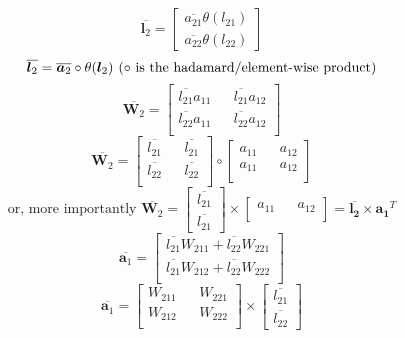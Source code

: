 \documentclass{article}
\begin{document}
\[\overline{\bm{l}_2} = \begin{bmatrix}
   \overline{a_{21}} \theta(l_{21}) \\ \overline{a_{22}} \theta(l_{22})
\end{bmatrix}\]
\begin{equation}
  \overline{\bm{l}_2} = \overline{\bm{a}_2} \circ \theta(\bm{l}_2) \hspace*{0.125cm}(\circ \text{ is the hadamard/element-wise product})
\end{equation}
\[
    \overline{\bm{W}_{2}} = \begin{bmatrix}
        \overline{l_{21}}a_{11} && \overline{l_{21}}a_{12}\\
        \overline{l_{22}}a_{11} && \overline{l_{22}}a_{12}\\
    \end{bmatrix}
\]
\[
    \overline{\bm{W}_{2}} = \begin{bmatrix}
        \overline{l_{21}} && \overline{l_{21}}\\
        \overline{l_{22}} && \overline{l_{22}}\\
    \end{bmatrix} \circ 
    \begin{bmatrix}
        a_{11} && a_{12}\\
        a_{11} && a_{12}\\
    \end{bmatrix}
\]
\begin{equation}
    \text{or, more importantly   }
    \overline{\bm{W}_{2}} = \begin{bmatrix}
        \overline{l_{21}} \\ \overline{l_{21}}
    \end{bmatrix} \times
    \begin{bmatrix}
        a_{11} && a_{12}\\
    \end{bmatrix}
    = \overline{\bm{l_{2}}} \times \bm{a_{1}}^T
\end{equation}
\[
    \overline{\bm{a}_{1}} = \begin{bmatrix}
       \overline{l_{21}} W_{211} + \overline{l_{22}}W_{221} \\ 
       \overline{l_{21}} W_{212} + \overline{l_{22}}W_{222} \\ 
    \end{bmatrix} 
\]
\[
    \overline{\bm{a}_{1}} = \begin{bmatrix}
       W_{211} && W_{221} \\ 
       W_{212} && W_{222} \\ 
    \end{bmatrix} \times 
    \begin{bmatrix}
      \overline{l_{21}} \\
      \overline{l_{22}}       
    \end{bmatrix}
\]
\end{document}
